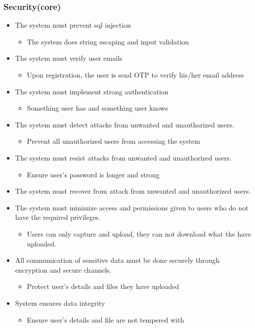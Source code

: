 \documentclass[a4paper,12pt]{article}
\begin{document}
	\subsubsection{Security(core)}
	\begin{itemize}
		\item The system must prevent sql injection
			\begin{itemize}
				\item The system does string escaping and input validation
			\end{itemize}
		\item The system must verify user emails
			\begin{itemize}
				\item Upon registration, the user is send OTP to verify his/her email address
			\end{itemize}
		\item The system must implement strong authentication
			\begin{itemize}
				\item Something user has and something user knows
			\end{itemize}
		\item The system must detect attacks from unwanted and unauthorized users.
			\begin{itemize}
				\item Prevent all unauthorized users from accessing the system 
			\end{itemize}
		\item The system must resist attacks from unwanted and unauthorized users.
			\begin{itemize}
				\item Ensure user's password is longer and strong
			\end{itemize}
		\item The system must recover from attack from unwanted and unauthorized users.
		
		\item The system must minimize access and permissions given to users who do not have the
			required privileges.
				\begin{itemize}
				\item Users can only capture and upload, they can not download what the have uploaded.
	 
			\end{itemize}
		\item All communication of sensitive data must be done securely through
			encryption and secure channels.
				\begin{itemize}
				\item Protect user's details and files they have uploaded
			\end{itemize}
		\item System ensures data integrity
				\begin{itemize}
				\item Ensure user's details and file are not tempered with 
			\end{itemize}
	\end{itemize}
\end{document}
